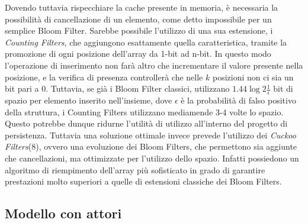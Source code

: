 		Dovendo tuttavia rispecchiare la cache presente in memoria, è necessaria la possibilità di cancellazione di un elemento, come detto impossibile per un semplice Bloom Filter. Sarebbe possibile l'utilizzo di una sua estensione, i \textit{Counting Filters}, che aggiungono esattamente quella caratteristica, tramite la promozione di ogni posizione dell'array da 1-bit ad n-bit. In questo modo l'operazione di inserimento non farà altro che incrementare il valore presente nella posizione, e la verifica di presenza controllerà che nelle $ k $ posizioni non ci sia un bit pari a 0. Tuttavia, se già i Bloom Filter classici, utilizzano $ 1.44\log{2}{\frac{1}{\epsilon}} $ bit di spazio per elemento inserito nell'insieme, dove $\epsilon$ è la probabilità di falso positivo della struttura, i Counting Filters utilizzano mediamende 3-4 volte lo spazio. Questo potrebbe dunque ridurne l'utilità di utilizzo all'interno del progetto di persistenza.
		Tuttavia una soluzione ottimale invece prevede l'utilizzo dei \textit{Cuckoo Filters}(8), ovvero una evoluzione dei Bloom Filters, che permettono sia aggiunte che cancellazioni, ma ottimizzate per l'utilizzo dello spazio. Infatti possiedono un algoritmo di riempimento dell'array più sofisticato in grado di garantire prestazioni molto superiori a quelle di estensioni classiche dei Bloom Filters.
		

	\subsection{Modello con attori}
	


